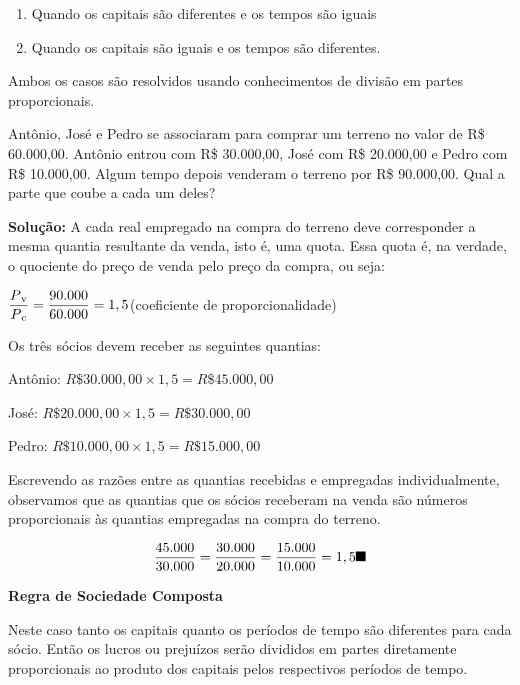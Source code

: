\begin{enumerate}[label=\arabic*)]
	\item Quando os capitais são diferentes e os tempos são iguais

	\item Quando os capitais são iguais e os tempos são diferentes. 
\end{enumerate}

Ambos os casos são resolvidos usando conhecimentos de divisão em partes proporcionais. 

\begin{texemplo}
	Antônio, José e Pedro se associaram para comprar um terreno no valor de R\$  60.000,00. Antônio entrou com R\$  30.000,00, José com R\$  20.000,00 e Pedro com R\$ 10.000,00. Algum tempo depois venderam o terreno por R\$ 90.000,00. Qual a parte que coube a cada um deles?

\textbf{Solução: }A cada real empregado na compra do terreno deve corresponder a mesma quantia resultante da venda, isto é, uma quota. Essa quota é, na verdade, o quociente do preço de venda pelo preço da compra, ou seja:

$\dfrac{P\text{\textsubscript{v}}}{P\text{\textsubscript{c}}}=\dfrac{90.000}{60.000}=1,5$\quad  (coeficiente de proporcionalidade)

Os três sócios devem receber as seguintes quantias:

	Antônio: $R\$30.000,00 \times 1,5 = R\$45.000,00$ 

	José: $R\$20.000,00 \times 1,5 = R\$30.000,00$

	Pedro: $R\$10.000,00 \times 1,5 = R\$15.000,00$

Escrevendo as razões entre as quantias recebidas e empregadas individualmente, observamos que as quantias que os sócios receberam na venda são números proporcionais às quantias empregadas na compra do terreno.

$$\dfrac{45.000}{30.000}=\dfrac{30.000}{20.000}=\dfrac{15.000}{10.000}=1,5 \textrm{\qedsymbol{}}$$
\end{texemplo}

\quad \textbf{Regra de Sociedade Composta}

\quad Neste caso tanto os capitais quanto os períodos de tempo são diferentes para cada sócio. Então os lucros ou prejuízos serão divididos em partes diretamente proporcionais ao produto dos capitais pelos respectivos períodos de tempo.

